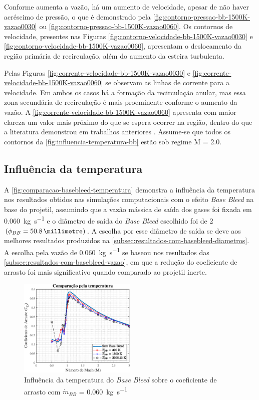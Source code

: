 Conforme aumenta a vazão, há um aumento de velocidade, apesar de não haver acréscimo de pressão, o que é demonstrado pela \autoref{fig:contorno-pressao-bb-1500K-vazao0030} ou \autoref{fig:contorno-pressao-bb-1500K-vazao0060}. Os contornos de velocidade, presentes nas Figuras \ref{fig:contorno-velocidade-bb-1500K-vazao0030} e \ref{fig:contorno-velocidade-bb-1500K-vazao0060}, apresentam o deslocamento da região primária de recirculação, além do aumento da esteira turbulenta. 

Pelas Figuras \ref{fig:corrente-velocidade-bb-1500K-vazao0030} e \ref{fig:corrente-velocidade-bb-1500K-vazao0060} se observam as linhas de corrente para a velocidade. Em ambos os casos há a formação da recirculação anular, mas essa zona secundária de recirculação é mais proeminente conforme o aumento da vazão. A \autoref{fig:corrente-velocidade-bb-1500K-vazao0060} apresenta com maior clareza um valor mais próximo do que se espera ocorrer na região, dentro do que a literatura demonstrou em trabalhos anteriores \cite{Sahu1985,Andersson1976}. Assume-se que todos os contornos da \autoref{fig:influencia-temperatura-bb} estão sob regime M = \num{2,0}.

\subsection{Influência da temperatura}

A \autoref{fig:comparacao-basebleed-temperatura} demonstra a influência da temperatura nos resultados obtidos nas simulações computacionais com o efeito \textit{Base Bleed} na base do projetil, assumindo que a vazão mássica de saída dos gases foi fixada em \qty{0,060}{\kilogram\per\second} e o diâmetro de saída do \textit{Base Bleed} escolhido foi de \qty{2}{\polegada} \(\left(\phi_{BB} = \qty{50,8}{\millimetre}\right)\). A escolha por esse diâmetro de saída se deve aos melhores resultados produzidos na \autoref{subsec:resultados-com-basebleed-diametros}. A escolha pela vazão de \qty{0,060}{\kilogram\per\second} se baseou nos resultados das \autoref{subsec:resultados-com-basebleed-vazao}, em que a redução do coeficiente de arrasto foi mais significativo quando comparado ao projetil inerte.

\begin{figure}[!ht]
	\centering
	\includegraphics[width=0.5\textwidth]{cd-combasebleed-vazao006-2pol.eps}
	\caption{Influência da temperatura do \textit{Base Bleed} sobre o coeficiente de arrasto com \(\Dot{m}_{BB}\) = \qty{0,060}{\kilogram\per\second}}
	\label{fig:comparacao-basebleed-temperatura}
\end{figure}

